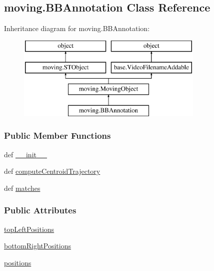 \hypertarget{classmoving_1_1BBAnnotation}{\subsection{moving.\-B\-B\-Annotation Class Reference}
\label{classmoving_1_1BBAnnotation}
}
Inheritance diagram for moving.\-B\-B\-Annotation\-:\begin{figure}[H]
\begin{center}
\leavevmode
\includegraphics[height=4.000000cm]{classmoving_1_1BBAnnotation}
\end{center}
\end{figure}
\subsubsection*{Public Member Functions}
\begin{DoxyCompactItemize}
\item 
def \hyperlink{classmoving_1_1BBAnnotation_a44f6380b3b0377241c4768c1496afb44}{\-\_\-\-\_\-init\-\_\-\-\_\-}
\item 
def \hyperlink{classmoving_1_1BBAnnotation_aec41e86c251788e5edeb62849fd947f2}{compute\-Centroid\-Trajectory}
\item 
def \hyperlink{classmoving_1_1BBAnnotation_a129e3755fa6eb0ee2d230a21028e924e}{matches}
\end{DoxyCompactItemize}
\subsubsection*{Public Attributes}
\begin{DoxyCompactItemize}
\item 
\hyperlink{classmoving_1_1BBAnnotation_a5ccafeea40b41e138d54c6cbcf11ae1f}{top\-Left\-Positions}
\item 
\hyperlink{classmoving_1_1BBAnnotation_abc54d8997043b819f76dced20c48b94d}{bottom\-Right\-Positions}
\item 
\hyperlink{classmoving_1_1BBAnnotation_a0f4ee909fb7d67b60f5abc94943207c5}{positions}
\end{DoxyCompactItemize}
